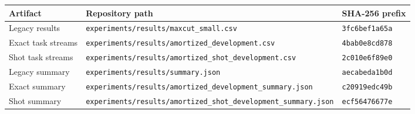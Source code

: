 \begin{tabular}{lll}
\toprule
Artifact & Repository path & SHA-256 prefix \\
\midrule
Legacy results & \texttt{experiments/results/maxcut\_small.csv} & \texttt{3fc6bef1a65a} \\
Exact task streams & \texttt{experiments/results/amortized\_development.csv} & \texttt{4bab0e8cd878} \\
Shot task streams & \texttt{experiments/results/amortized\_shot\_development.csv} & \texttt{2c010e6f89e0} \\
Legacy summary & \texttt{experiments/results/summary.json} & \texttt{aecabeda1b0d} \\
Exact summary & \texttt{experiments/results/amortized\_development\_summary.json} & \texttt{c20919edc49b} \\
Shot summary & \texttt{experiments/results/amortized\_shot\_development\_summary.json} & \texttt{ecf56476677e} \\
\bottomrule
\end{tabular}
